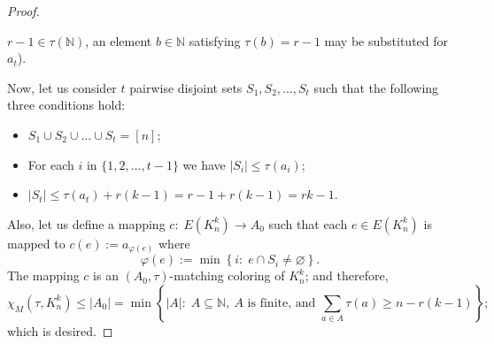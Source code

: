 \documentclass[10pt,a4paper]{amsart}
\begin{document}
\begin{proof}
\begin{itemize}
		$r-1\in\tau(\mathbb{N})$, an element
		$b \in \mathbb{N}$ satisfying $\tau(b)=r-1$
		may be substituted for 
		$a_{t}$).
	\end{itemize}
	Now, let us consider $t$ pairwise disjoint sets $S_1, S_2, \ldots, S_t$ such that
	the following three conditions hold:
	\begin{itemize}
		\item $S_{1} \cup S_{2} \cup \dots \cup S_{t}=[n]$;
		\item For each $i$ in $\{1,2,\ldots ,t-1\}$ we have $|S_i|\leq \tau (a_i)$;
		\item $ |S_{t}| \leq \tau (a_t) + r(k-1) = r-1 + r(k-1)=rk-1$.
	\end{itemize}
	Also, let us define a mapping $c:\; E\left(K_n^k\right)\longrightarrow A_0$ such that each $e\in E\left(K_n^k\right)$ is mapped to $c(e):=a_{\varphi (e)}$ where
	$$ \varphi (e) := \min \left\{i:\; e\cap S_i\neq \varnothing \right\} . $$
	The mapping $c$ is an $\left(A_0 ,\tau \right)$-matching coloring of $K_n^k$; and therefore,
	$$\chi_M\left(\tau,K_n^k\right)\leq \left| A_0 \right| = \min \left\{|A|:\; A\subseteq \mathbb{N},\ A \mbox{ is finite, and } \sum_{a\in A}\tau(a) \geq  n-r(k-1)\right\} ;$$
	which is desired.
\end{proof}
\end{document}
